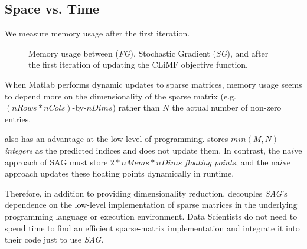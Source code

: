 \subsection{Space vs. Time}
We measure memory usage after the first iteration.

\begin{figure}
\centerline{}
\caption[Memory usage after first iteration]{Memory usage between (\emph{FG}), Stochastic Gradient (\emph{SG}), and \tool after the first iteration of updating the CLiMF \cite{climf} objective function.}
\label{table:memory}
\end{figure}

When Matlab performs dynamic updates to sparse matrices, memory usage seems to depend more on the dimensionality of the sparse matrix 
(e.g. $(nRows*nCols)$-by-$nDims$) rather than $N$ the actual number of non-zero entries.

\tool also has an advantage at the low level of programming.
\tool stores $min(M,N)$ \emph{integers} as the predicted indices and does not update them.
In contrast, the na$\ddot{i}$ve approach of SAG must store $2*nMems*nDims$ \emph{floating points}, and the na$\ddot{i}$ve approach updates these floating points dynamically in runtime.

Therefore, in addition to providing dimensionality reduction, 
\tool decouples \emph{SAG}'s dependence on the low-level implementation of sparse matrices in the underlying programming language or execution environment.
Data Scientists do not need to spend time to find an efficient sparse-matrix implementation and integrate it into their code just to use \emph{SAG}.
